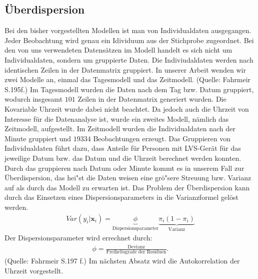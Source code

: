 \subsection{Überdispersion}
Bei den bisher vorgestellten Modellen ist man von Individualdaten ausgegangen. Jeder Beobachtung wird genau ein Idividuum aus der Stichprobe zugeordnet.
Bei den von uns verwendeten Datensätzen im Modell handelt es sich nicht um Individualdaten, sondern um gruppierte Daten. Die Indiviudaldaten werden nach identischen Zeilen in der Datenmatrix gruppiert. In unserer Arbeit wenden wir zwei Modelle an, einmal das Tagesmodell und das Zeitmodell. (Quelle: Fahrmeir S.195f.) Im Tagesmodell wurden die Daten nach dem Tag bzw. Datum gruppiert, wodurch insgesamt $101$ Zeilen in der Datenmatrix generiert wurden. Die Kovariable Uhrzeit wurde dabei nicht beachtet. Da jedoch auch die Uhrzeit von Interesse für die Datenanalyse ist, wurde ein zweites Modell, nämlich das Zeitmodell, aufgestellt. Im Zeitmodell wurden die Individualdaten nach der Minute gruppiert und $19334$ Beobachtungen erzeugt. Das Gruppieren von Individualdaten führt dazu, dass Anteile für Personen mit LVS-Gerät für das jeweilige Datum bzw. das Datum und die Uhrzeit berechnet werden konnten. Durch das gruppieren nach Datum oder Minute kommt es in unserem Fall zur Überdispersion, das hei"st die Daten weisen eine grö"sere Streuung bzw. Varianz auf als durch das Modell zu erwarten ist. Das Problem der Überdispersion kann durch das Einsetzen eines Dispersionsparameters in die Varianzformel gelöst werden.
\begin{align}
Var(y_{i}|\textbf{x}_{i})=\underbrace{\phi}_\text{Dispersionsparameter} \underbrace{\pi_{i}(1-\pi_{i})}_\text{Varianz}
\end{align}
Der Dispersionsparameter wird errechnet durch:
\begin{align}
\phi=\frac{\text{Devianz}}{\text{Freiheitsgrade der Residuen}}.
\end{align} 
(Quelle: Fahrmeir S.197 f.)
Im nächsten Absatz wird die Autokorrelation der Uhrzeit vorgestellt.
